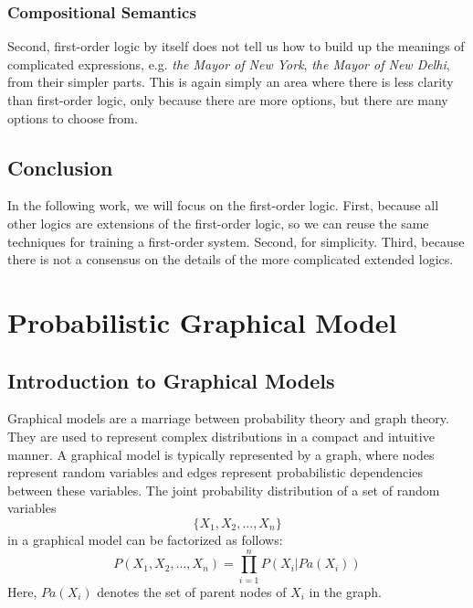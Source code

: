 \documentclass[12pt]{article}
\begin{document}
\subsubsection{Compositional Semantics}
Second, first-order logic by itself does not tell us how to build up the meanings of complicated expressions, e.g. {\em the Mayor of New York}, {\em the Mayor of New Delhi}, from their simpler parts.
This is again simply an area where there is less clarity than first-order logic, only because there are more options, but there are many options to choose from.
\subsection{Conclusion}
In the following work, we will focus on the first-order logic.
First, because all other logics are extensions of the first-order logic, so we can reuse the same techniques for training a first-order system.
Second, for simplicity.
Third, because there is not a consensus on the details of the more complicated extended logics.

\section{Probabilistic Graphical Model}
\subsection{Introduction to Graphical Models}
Graphical models are a marriage between probability theory and graph theory. They are used to represent complex distributions in a compact and intuitive manner. A graphical model is typically represented by a graph, where nodes represent random variables and edges represent probabilistic dependencies between these variables.
The joint probability distribution of a set of random variables 
\[ \{X_1, X_2, ..., X_n\} \]
in a graphical model can be factorized as follows:
\begin{equation}
    P(X_1, X_2, ..., X_n) = \prod_{i=1}^{n} P(X_i | Pa(X_i))
\end{equation}
Here, \( Pa(X_i) \) denotes the set of parent nodes of \( X_i \) in the graph.
\end{document}

